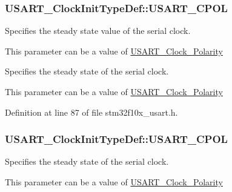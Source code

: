 \hypertarget{struct_u_s_a_r_t___clock_init_type_def_a01450cba8a40cf9a624b25979dc6aa77}{
\subsubsection[{U\-S\-A\-R\-T\-\_\-\-C\-P\-O\-L}]{ U\-S\-A\-R\-T\-\_\-\-Clock\-Init\-Type\-Def\-::\-U\-S\-A\-R\-T\-\_\-\-C\-P\-O\-L}}\label{struct_u_s_a_r_t___clock_init_type_def_a01450cba8a40cf9a624b25979dc6aa77}
\begin{DoxyVerb}    Specifies the steady state value of the serial clock.
\end{DoxyVerb}
 This parameter can be a value of \hyperlink{group___u_s_a_r_t___clock___polarity}{U\-S\-A\-R\-T\-\_\-\-Clock\-\_\-\-Polarity}

\begin{DoxyVerb}    Specifies the steady state of the serial clock.
\end{DoxyVerb}
 This parameter can be a value of \hyperlink{group___u_s_a_r_t___clock___polarity}{U\-S\-A\-R\-T\-\_\-\-Clock\-\_\-\-Polarity} 

Definition at line 87 of file stm32f10x\-\_\-usart.\-h.

\hypertarget{struct_u_s_a_r_t___clock_init_type_def_a640dfb118c99156f34c0769eb8138cfb}{
\subsubsection[{U\-S\-A\-R\-T\-\_\-\-C\-P\-O\-L}]{ U\-S\-A\-R\-T\-\_\-\-Clock\-Init\-Type\-Def\-::\-U\-S\-A\-R\-T\-\_\-\-C\-P\-O\-L}}\label{struct_u_s_a_r_t___clock_init_type_def_a640dfb118c99156f34c0769eb8138cfb}
\begin{DoxyVerb}              Specifies the steady state of the serial clock.
\end{DoxyVerb}
 This parameter can be a value of \hyperlink{group___u_s_a_r_t___clock___polarity}{U\-S\-A\-R\-T\-\_\-\-Clock\-\_\-\-Polarity} 

